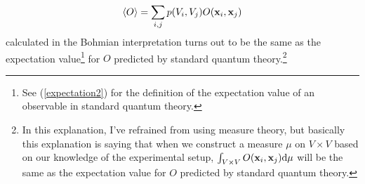 \begin{equation}\label{bohmconsistency}
\ev{O}=\sum_{i,j}p(V_i, V_j)O(\vb{x}_i, \vb{x}_j)
\end{equation}
calculated %
%
in the Bohmian interpretation turns out to be the same as the expectation value\footnote{See (\ref{expectation2}) for the definition of the expectation value of an observable in standard quantum theory.} for $O$ predicted by standard quantum theory.\footnote{In this explanation, I've refrained from using measure theory, but basically this explanation is saying that when we construct a measure $\mu$ on $V\times V$ based on our knowledge of the experimental setup,  $\int_{V\times V}O(\vb{x}_i, \vb{x}_j)\dd\mu$ will be the same as the expectation value for $O$ predicted by standard quantum theory. }


